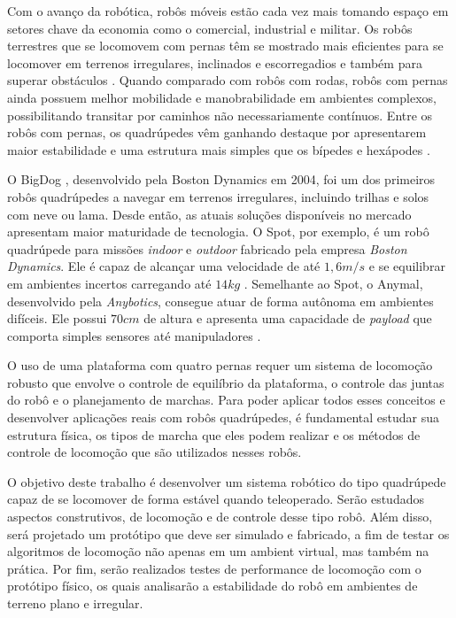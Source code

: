 \documentclass[../main.tex]{subfiles}
\begin{document}
Com o avanço da robótica, robôs móveis estão cada vez mais tomando espaço em setores chave da economia como o comercial, industrial e militar. Os robôs terrestres que se locomovem com pernas têm se mostrado mais eficientes para se locomover em terrenos irregulares, inclinados e escorregadios e também para superar obstáculos \cite{X.134}. Quando comparado com robôs com rodas, robôs com pernas ainda possuem melhor mobilidade e manobrabilidade em ambientes complexos, possibilitando transitar por caminhos não necessariamente contínuos. Entre os robôs com pernas, os quadrúpedes vêm ganhando destaque por apresentarem maior estabilidade e uma estrutura mais simples que os bípedes e hexápodes \cite{Shi2021}.

O BigDog \cite{RAIBERT200810822}, desenvolvido pela Boston Dynamics em 2004, foi um dos primeiros robôs quadrúpedes a navegar em terrenos irregulares, incluindo trilhas e solos com neve ou lama. Desde então, as atuais soluções disponíveis no mercado apresentam maior maturidade de tecnologia. O Spot, por exemplo, é um robô quadrúpede para missões \textit{indoor} e \textit{outdoor} fabricado pela empresa \textit{Boston Dynamics}. Ele é capaz de alcançar uma velocidade de até $1,6 m/s$ e se equilibrar em ambientes incertos carregando até $14 kg$ \cite{Spot}.  Semelhante ao Spot, o Anymal, desenvolvido pela \textit{Anybotics}, consegue atuar de forma autônoma em ambientes difíceis. Ele possui $70 cm$ de altura e apresenta uma capacidade de \textit{payload} que comporta simples sensores até manipuladores \cite{Fankhauser2018}.

O uso de uma plataforma com quatro pernas requer um sistema de locomoção robusto que envolve o controle de equilíbrio da plataforma, o controle das juntas do robô e o planejamento de marchas. Para poder aplicar todos esses conceitos e desenvolver aplicações reais com robôs quadrúpedes, é fundamental estudar sua estrutura física, os tipos de marcha que eles podem realizar e os métodos de controle de locomoção que são utilizados nesses robôs.

O objetivo deste trabalho é desenvolver um sistema robótico do tipo quadrúpede capaz de se locomover de forma estável quando teleoperado. Serão estudados aspectos construtivos, de locomoção e de controle desse tipo robô. Além disso, será projetado um protótipo que deve ser simulado e fabricado, a fim de testar os algoritmos de locomoção não apenas em um ambient virtual, mas também na prática. Por fim, serão realizados testes de performance de locomoção com o protótipo físico, os quais analisarão a estabilidade do robô em ambientes de terreno plano e irregular.
\end{document}
